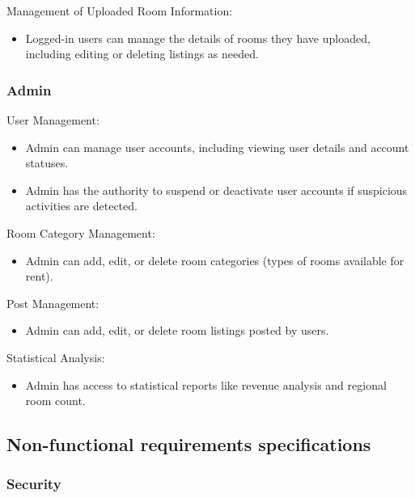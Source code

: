\documentclass[../Main.tex]{subfiles}
\begin{document}
Management of Uploaded Room Information:
\begin{itemize}
    \item Logged-in users can manage the details of rooms they have uploaded, including editing or deleting listings as needed.
\end{itemize}

\subsubsection{Admin}

User Management:
\begin{itemize}
    \item Admin can manage user accounts, including viewing user details and account statuses.
    \item Admin has the authority to suspend or deactivate user accounts if suspicious activities are detected.
\end{itemize}

Room Category Management:
\begin{itemize}
    \item Admin can add, edit, or delete room categories (types of rooms available for rent).
\end{itemize}

Post Management:
\begin{itemize}
    \item Admin can add, edit, or delete room listings posted by users.
\end{itemize}

Statistical Analysis:
\begin{itemize}
    \item Admin has access to statistical reports like revenue analysis and regional room count.
\end{itemize}

\subsection{Non-functional requirements specifications}

\subsubsection{Security}
\end{document}

